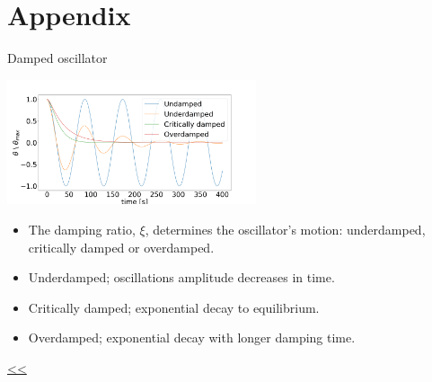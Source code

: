 \documentclass{beamer}
\begin{document}
\section{Appendix}

\begin{frame}{\hypertarget{frame:Damped oscillator}{Damped oscillator}}

	\begin{center}		
		\includegraphics[width=0.55\textwidth,keepaspectratio]{damp.png}
    \end{center}
	\begin{itemize}	
		\item The damping ratio, $\xi$, determines the oscillator's motion: underdamped, critically damped or overdamped.
		\item Underdamped; oscillations amplitude decreases in time.
		\item Critically damped; exponential decay to equilibrium.
		\item Overdamped; exponential decay with longer damping time. 		
	\end{itemize}
	\hyperlink{frame:Harmonic oscillator}{<<} 
\end{frame}
\end{document}

